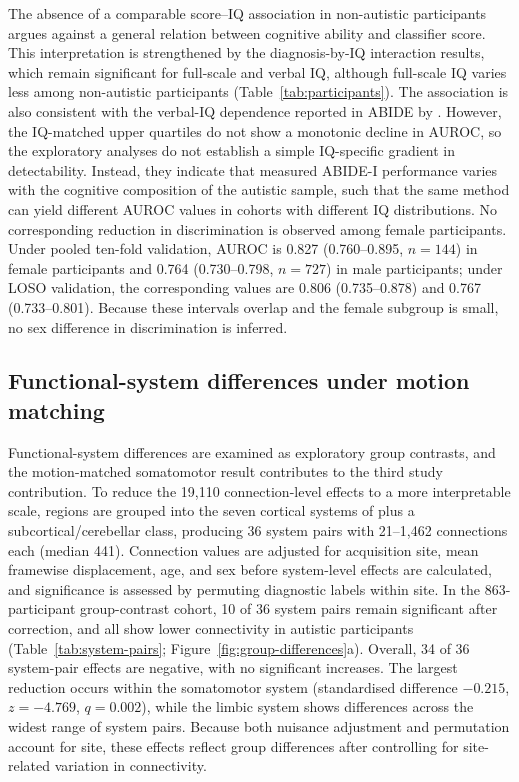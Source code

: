 The absence of a comparable score--IQ association in non-autistic participants argues against a general relation between cognitive ability and classifier score. This interpretation is strengthened by the diagnosis-by-IQ interaction results, which remain significant for full-scale and verbal IQ, although full-scale IQ varies less among non-autistic participants (Table~\ref{tab:participants}). The association is also consistent with the verbal-IQ dependence reported in ABIDE by \citet{Nielsenetal2013}. However, the IQ-matched upper quartiles do not show a monotonic decline in AUROC, so the exploratory analyses do not establish a simple IQ-specific gradient in detectability. Instead, they indicate that measured ABIDE-I performance varies with the cognitive composition of the autistic sample, such that the same method can yield different AUROC values in cohorts with different IQ distributions. No corresponding reduction in discrimination is observed among female participants. Under pooled ten-fold validation, AUROC is 0.827 (0.760--0.895, $n=144$) in female participants and 0.764 (0.730--0.798, $n=727$) in male participants; under LOSO validation, the corresponding values are 0.806 (0.735--0.878) and 0.767 (0.733--0.801). Because these intervals overlap and the female subgroup is small, no sex difference in discrimination is inferred.

\subsection{Functional-system differences under motion matching}
\label{subsec:results-system-differences}

Functional-system differences are examined as exploratory group contrasts, and the motion-matched somatomotor result contributes to the third study contribution. To reduce the 19,110 connection-level effects to a more interpretable scale, regions are grouped into the seven cortical systems of \citet{Yeoetal2011} plus a subcortical/cerebellar class, producing 36 system pairs with 21--1,462 connections each (median 441). Connection values are adjusted for acquisition site, mean framewise displacement, age, and sex before system-level effects are calculated, and significance is assessed by permuting diagnostic labels within site. In the 863-participant group-contrast cohort, 10 of 36 system pairs remain significant after correction, and all show lower connectivity in autistic participants (Table~\ref{tab:system-pairs}; Figure~\ref{fig:group-differences}a). Overall, 34 of 36 system-pair effects are negative, with no significant increases. The largest reduction occurs within the somatomotor system (standardised difference $-0.215$, $z=-4.769$, $q=0.002$), while the limbic system shows differences across the widest range of system pairs. Because both nuisance adjustment and permutation account for site, these effects reflect group differences after controlling for site-related variation in connectivity.

